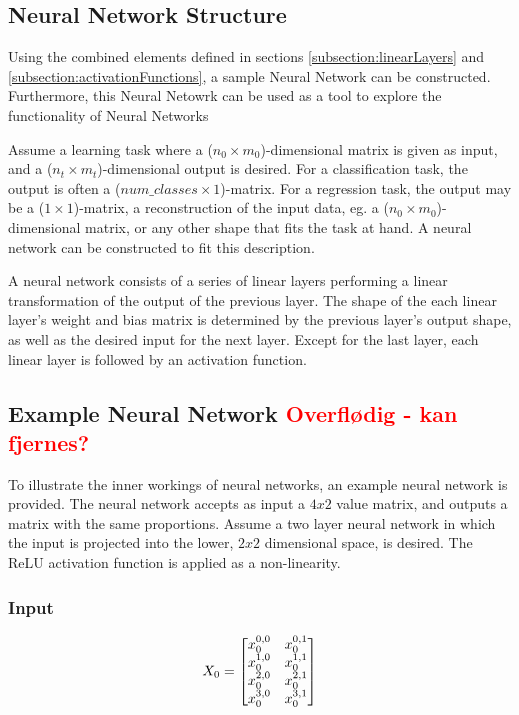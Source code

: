 \subsection{Neural Network Structure}

Using the combined elements defined in sections \ref{subsection:linearLayers} and \ref{subsection:activationFunctions}, 
a sample Neural Network can be constructed. Furthermore, this Neural Netowrk can be used as a tool to explore the functionality of Neural Networks

Assume a learning task where a ($ n_0 \times m_0 $)-dimensional matrix is given as input, and a ($ n_t \times m_t $)-dimensional output is desired. 
For a classification task, the output is often a ($ num\_classes \times 1 $)-matrix. 
For a regression task, the output may be a  ($ 1 \times 1 $)-matrix, a reconstruction of the input data, eg. a ($ n_0 \times m_0 $)-dimensional matrix, 
or any other shape that fits the task at hand.
A neural network can be constructed to fit this description.

A neural network consists of a series of linear layers performing a linear transformation of the output of the previous layer.
The shape of the each linear layer's weight and bias matrix is determined by the previous layer's output shape, 
as well as the desired input for the next layer. Except for the last layer, each linear layer is followed by an activation function.


\subsection{Example Neural Network \textcolor{red}{\textbf{Overflødig - kan fjernes?}}}
\label{subsection:sample_network}

To illustrate the inner workings of neural networks, an example neural network is provided. 
The neural network accepts as input a $ 4 x 2 $ value matrix, and outputs a matrix with the same proportions.
Assume a two layer neural network in which the input is projected into the lower, $ 2 x 2 $ dimensional space, is desired.
The ReLU activation function is applied as a non-linearity.


\subsubsection{Input}
\[
X_0 = 
\begin{bmatrix}
    x^{0,\space 0}_0 & x^{0,\space 1}_0 \\
    x^{1,\space 0}_0 & x^{1,\space 1}_0 \\
    x^{2,\space 0}_0 & x^{2,\space 1}_0 \\
    x^{3,\space 0}_0 & x^{3,\space 1}_0
\end{bmatrix}
\]


